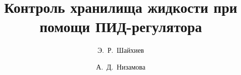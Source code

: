 

\usepackage{todonotes} %

\usepackage[russian]{nla}

%
%


%




%
\fi

\title{Контроль хранилища жидкости при помощи ПИД-регулятора}
\author{Э.~Р.~Шайхиев  %
  \and  %
  А.~Д.~Низамова
  \and
} %


\maketitle

